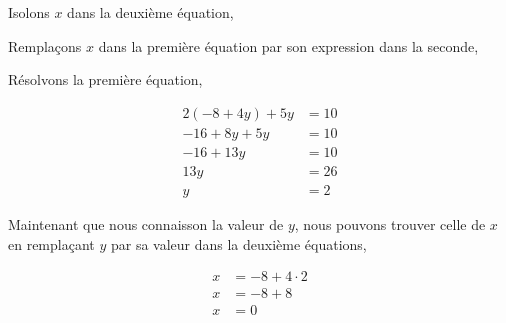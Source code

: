 %
%

    Isolons $x$ dans la deuxième équation,


    Remplaçons $x$ dans la première équation par son expression dans la seconde,


    Résolvons la première équation,

    \begin{equation*}
        \begin{aligned}
            2(-8+4y) + 5y & = 10 \\
            -16 + 8y + 5y & = 10 \\
            -16 + 13 y    & = 10 \\
            13 y          & = 26 \\
            y             & = 2
        \end{aligned}
    \end{equation*}

    Maintenant que nous connaisson la valeur de $y$, nous pouvons trouver celle de $x$ en remplaçant $y$ par sa valeur dans la deuxième équations,

    \begin{equation*}
        \begin{aligned}
            x & = -8 + 4 \cdot 2 \\
            x & = -8 + 8         \\
            x & = 0
        \end{aligned}
    \end{equation*}
